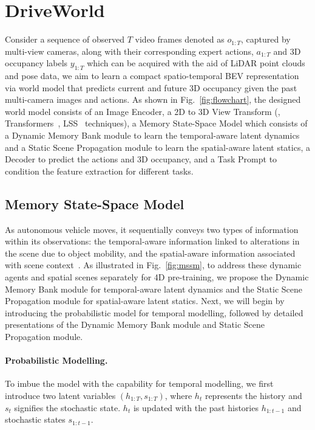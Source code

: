 \section{DriveWorld}	
Consider a sequence of observed $T$ video frames denoted as $o_{1:T}$, captured by multi-view cameras, along with their corresponding expert actions, $a_{1:T}$ and 3D occupancy labels $y_{1:T}$ which can be acquired with the aid of LiDAR point clouds and pose data, we aim to learn a compact spatio-temporal BEV representation via world model that predicts current and future 3D occupancy given the past multi-camera images and actions. As shown in Fig.~\ref{fig:flowchart}, the designed world model consists of an Image Encoder, a 2D to 3D View Transform (\eg, Transformers~\cite{detr3d}, LSS~\cite{lss} techniques), a Memory State-Space Model which consists of a Dynamic Memory Bank module to learn the temporal-aware latent dynamics and a Static Scene Propagation module to learn the spatial-aware latent statics, a Decoder to predict the actions and 3D occupancy, and a Task Prompt to condition the feature extraction for different tasks. 

\subsection{Memory State-Space Model}

As autonomous vehicle moves, it sequentially conveys two types of information within its observations: the temporal-aware information linked to alterations in the scene due to object mobility, and the spatial-aware information associated with scene context~\cite{contextwm}. As illustrated in Fig.~\ref{fig:mssm}, to address these dynamic agents and spatial scenes separately for 4D pre-training, we propose the Dynamic Memory Bank module for temporal-aware latent dynamics and the Static Scene Propagation module for spatial-aware latent statics. Next, we will begin by introducing the probabilistic model for temporal modelling, followed by detailed presentations of the Dynamic Memory Bank module and Static Scene Propagation module.

\paragraph{Probabilistic Modelling.}
To imbue the model with the capability for temporal modelling, we first introduce two latent variables $(h_{1:T}, s_{1:T})$, where $h_t$ represents the history and $s_t$ signifies the stochastic state. $h_t$ is updated with the past histories $h_{1:t-1}$ and stochastic states $s_{1:t-1}$. 

